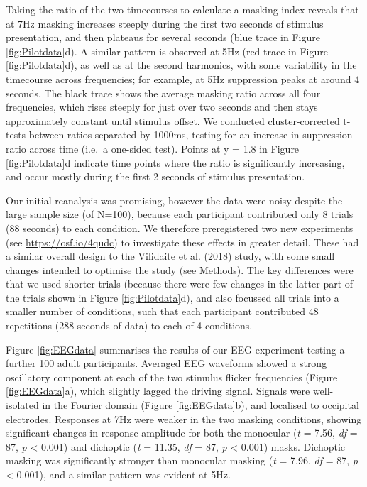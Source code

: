 \documentclass[
]{article}
\begin{document}
Taking the ratio of the two timecourses to calculate a masking index reveals that at 7Hz masking increases steeply during the first two seconds of stimulus presentation, and then plateaus for several seconds (blue trace in Figure \ref{fig:Pilotdata}d). A similar pattern is observed at 5Hz (red trace in Figure \ref{fig:Pilotdata}d), as well as at the second harmonics, with some variability in the timecourse across frequencies; for example, at 5Hz suppression peaks at around 4 seconds. The black trace shows the average masking ratio across all four frequencies, which rises steeply for just over two seconds and then stays approximately constant until stimulus offset. We conducted cluster-corrected t-tests between ratios separated by 1000ms, testing for an increase in suppression ratio across time (i.e.~a one-sided test). Points at y = 1.8 in Figure \ref{fig:Pilotdata}d indicate time points where the ratio is significantly increasing, and occur mostly during the first 2 seconds of stimulus presentation.

Our initial reanalysis was promising, however the data were noisy despite the large sample size (of N=100), because each participant contributed only 8 trials (88 seconds) to each condition. We therefore preregistered two new experiments (see \url{https://osf.io/4qudc}) to investigate these effects in greater detail. These had a similar overall design to the Vilidaite et al. (2018) study, with some small changes intended to optimise the study (see Methods). The key differences were that we used shorter trials (because there were few changes in the latter part of the trials shown in Figure \ref{fig:Pilotdata}d), and also focussed all trials into a smaller number of conditions, such that each participant contributed 48 repetitions (288 seconds of data) to each of 4 conditions.

Figure \ref{fig:EEGdata} summarises the results of our EEG experiment testing a further 100 adult participants. Averaged EEG waveforms showed a strong oscillatory component at each of the two stimulus flicker frequencies (Figure \ref{fig:EEGdata}a), which slightly lagged the driving signal. Signals were well-isolated in the Fourier domain (Figure \ref{fig:EEGdata}b), and localised to occipital electrodes. Responses at 7Hz were weaker in the two masking conditions, showing significant changes in response amplitude for both the monocular (\emph{t} = 7.56, \emph{df} = 87, \emph{p} \textless{} 0.001) and dichoptic (\emph{t} = 11.35, \emph{df} = 87, \emph{p} \textless{} 0.001) masks. Dichoptic masking was significantly stronger than monocular masking (\emph{t} = 7.96, \emph{df} = 87, \emph{p} \textless{} 0.001), and a similar pattern was evident at 5Hz.
\end{document}
